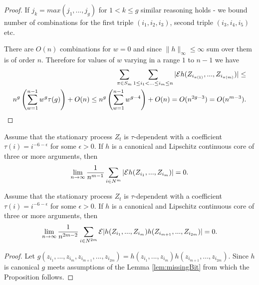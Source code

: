 \begin{proof}
If $j_k=max(j_1,...,j_g)$ for $1 < k \leq g$ similar reasoning holds - we bound number of combinations for the first triple $(i_1,i_2,i_3)$, second triple $(i_3,i_4,i_5)$ etc. 

There are $O(n)$ combinations for $w=0$ and since $\parallel h \parallel_{\infty} \leq \infty$ sum over them is of order $n$. Therefore for values of $w$ varying in a range $1$ to $n-1$ we have 
\begin{align}
 \sum_{\pi \in S_m} \sum_{1 \leq i_1< ...\leq i_m \leq n} |\mathcal{E}   h(Z_{i_{\pi(1)}},...,Z_{i_{\pi(m)}})|  \leq \\
n^g \left( \sum_{w=1}^{n-1} w^g \tau(g) \right) + O(n)  \leq  n^g \left( \sum_{w=1}^{n-1} w^{g-4} \right)+O(n) = O( n^{2g-3}) = O( n^{m-3}).
\end{align}
\end{proof}


\begin{corollary}
\label{lem:auxAsymp1}
Assume that the stationary process $Z_t$ is $\tau$-dependent with a coefficient $\tau(i) = i^{-6-\epsilon}$ for some $\epsilon>0$. If $h$ is a canonical and Lipschitz continuous core of three or more arguments, then 
\begin{align}
 \lim_{n \to \infty} \frac{1}{n^{m-1}} \sum_{i \in N^{m}} |\mathcal{E}   h(Z_{i_1},...,Z_{i_m})| =0.
\end{align}
\end{corollary}




\begin{lemma}
\label{lem:auxAsymp2}
Assume that the stationary process $Z_t$ is $\tau$-dependent with a coefficient $\tau(i) = i^{-6-\epsilon}$ for some $\epsilon>0$. If $h$ is a canonical and Lipschitz continuous core of three or more arguments, then
\[
  \lim_{n \to \infty}\frac{1} {n^{2m-2}}   \sum_{i \in N^{2m}} \mathcal{E} |h(Z_{i_1},...,Z_{i_m})h(Z_{i_{m+1}},...,Z_{i_{2m}})| = 0.
\]
\end{lemma}
\begin{proof}
Let $g(z_{i_1},...,z_{i_m},z_{i_{m+1}},...,z_{i_{2m}})=h(z_{i_1},...,z_{i_m})h(z_{i_{m+1}},...,z_{i_{2m}})$. Since $h$ is canonical $g$ meets assumptions of the Lemma \ref{lem:missingBit} from which the Proposition follows.
\end{proof}





